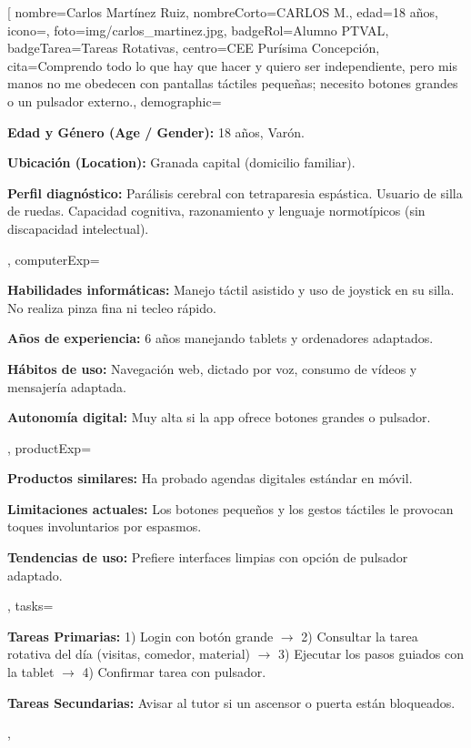 \documentclass[10pt]{article}
\begin{document}
\fichaAlumno[%
    nombre={Carlos Martínez Ruiz},
    nombreCorto={CARLOS M.},
    edad={18 años},
    icono={\faWheelchair},
    foto={img/carlos_martinez.jpg},
    badgeRol={Alumno PTVAL},
    badgeTarea={Tareas Rotativas},
    centro={CEE Purísima Concepción},
    cita={Comprendo todo lo que hay que hacer y quiero ser independiente, pero mis manos no me obedecen con pantallas táctiles pequeñas; necesito botones grandes o un pulsador externo.},
    demographic={%
        \item \textbf{Edad y Género (Age / Gender):} 18 años, Varón.
        \item \textbf{Ubicación (Location):} Granada capital (domicilio familiar).
        \item \textbf{Perfil diagnóstico:} Parálisis cerebral con tetraparesia espástica. Usuario de silla de ruedas. Capacidad cognitiva, razonamiento y lenguaje normotípicos (sin discapacidad intelectual).
    },
    computerExp={%
        \item \textbf{Habilidades informáticas:} Manejo táctil asistido y uso de joystick en su silla. No realiza pinza fina ni tecleo rápido.
        \item \textbf{Años de experiencia:} 6 años manejando tablets y ordenadores adaptados.
        \item \textbf{Hábitos de uso:} Navegación web, dictado por voz, consumo de vídeos y mensajería adaptada.
        \item \textbf{Autonomía digital:} Muy alta si la app ofrece botones grandes o pulsador.
    },
    productExp={%
        \item \textbf{Productos similares:} Ha probado agendas digitales estándar en móvil.
        \item \textbf{Limitaciones actuales:} Los botones pequeños y los gestos táctiles le provocan toques involuntarios por espasmos.
        \item \textbf{Tendencias de uso:} Prefiere interfaces limpias con opción de pulsador adaptado.
    },
    tasks={%
        \item \textbf{Tareas Primarias:} 
        1) Login con botón grande $\rightarrow$ 2) Consultar la tarea rotativa del día (visitas, comedor, material) $\rightarrow$ 3) Ejecutar los pasos guiados con la tablet $\rightarrow$ 4) Confirmar tarea con pulsador.
        \item \textbf{Tareas Secundarias:} Avisar al tutor si un ascensor o puerta están bloqueados.
    },
\end{document}
